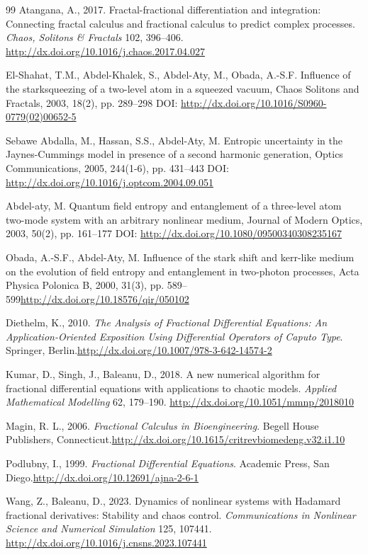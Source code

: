 \documentclass[10pt]{NSP1}
\begin{document}
\begin{thebibliography}{99}
 Atangana, A., 2017. Fractal-fractional differentiation and integration: Connecting fractal calculus and fractional calculus to predict complex processes. \emph{Chaos, Solitons \& Fractals} 102, 396--406. \url{http://dx.doi.org/10.1016/j.chaos.2017.04.027}


 El-Shahat, T.M., Abdel-Khalek, S., Abdel-Aty, M., Obada, A.-S.F.
Influence of the starksqueezing of a two-level atom in a squeezed vacuum, Chaos Solitons and Fractals, 2003, 18(2), pp. 289--298 DOI: \url{http://dx.doi.org/10.1016/S0960-0779(02)00652-5}

 Sebawe Abdalla, M., Hassan, S.S., Abdel-Aty, M.
Entropic uncertainty in the Jaynes-Cummings model in presence of a second harmonic generation, Optics Communications, 2005, 244(1-6), pp. 431--443 DOI: \url{http://dx.doi.org/10.1016/j.optcom.2004.09.051}

 Abdel-aty, M. Quantum field entropy and entanglement of a three-level atom two-mode system with an arbitrary nonlinear medium, Journal of Modern Optics, 2003, 50(2), pp. 161–177 DOI: \url{http://dx.doi.org/10.1080/09500340308235167}

 Obada, A.-S.F., Abdel-Aty, M.
Influence of the stark shift and kerr-like medium on the evolution of field entropy and entanglement in two-photon processes, Acta Physica Polonica B, 2000, 31(3), pp. 589–599\url{http://dx.doi.org/10.18576/qir/050102}

 Diethelm, K., 2010. \emph{The Analysis of Fractional Differential Equations: An Application-Oriented Exposition Using Differential Operators of Caputo Type}. Springer, Berlin.\url{http://dx.doi.org/10.1007/978-3-642-14574-2}

 Kumar, D., Singh, J., Baleanu, D., 2018. A new numerical algorithm for fractional differential equations with applications to chaotic models. \emph{Applied Mathematical Modelling} 62, 179--190. \url{http://dx.doi.org/10.1051/mmnp/2018010}



 Magin, R. L., 2006. \emph{Fractional Calculus in Bioengineering}. Begell House Publishers, Connecticut.\url{http://dx.doi.org/10.1615/critrevbiomedeng.v32.i1.10}


 Podlubny, I., 1999. \emph{Fractional Differential Equations}. Academic Press, San Diego.\url{http://dx.doi.org/10.12691/ajna-2-6-1}

 Wang, Z., Baleanu, D., 2023. Dynamics of nonlinear systems with Hadamard fractional derivatives: Stability and chaos control. \emph{Communications in Nonlinear Science and Numerical Simulation} 125, 107441. \url{http://dx.doi.org/10.1016/j.cnsns.2023.107441}




\end{thebibliography}
\end{document}
